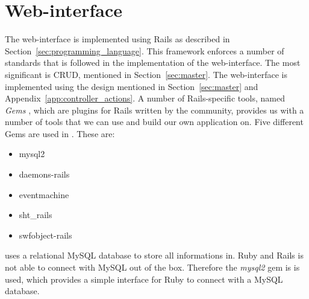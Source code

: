 

\section{Web-interface}
The web-interface is implemented using Rails as described in Section~\ref{sec:programming_language}.
This framework enforces a number of standards that is followed in the implementation of the web-interface.
The most significant is CRUD, mentioned in Section~\ref{sec:master}.
The web-interface is implemented using the design mentioned in Section~\ref{sec:master} and Appendix~\ref{app:controller_actions}.
A number of Rails-specific tools, named \emph{Gems} \citep{Rails_Gems}, which are plugins for Rails written by the community, provides us with a number of tools that we can use and build our own application on. 
Five different Gems are used in \projectname{}. 
These are: \\

\begin{itemize}
	\item mysql2
	\item daemons-rails
	\item eventmachine
	\item sht\_rails
	\item swfobject-rails
\end{itemize}

\projectname{} uses a relational MySQL database to store all informations in.
Ruby and Rails is not able to connect with MySQL out of the box. 
Therefore the \emph{mysql2} \citep{Rails_mysql2} gem is is used, which provides a simple interface for Ruby to connect with a MySQL database.


